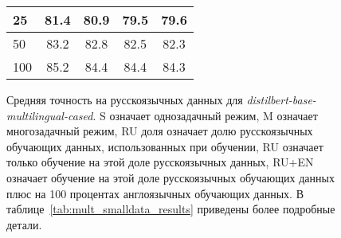 \begin{figure}[!htbp]
\begin{minipage}{0.45\textwidth}
{{\begin{tabular}[baseline={(0,2.1)}]{|l||c|c|c|c|}
25 & 81.4 & 80.9 & 79.5 & 79.6 \\ \hline
50 & 83.2 & 82.8 & 82.5 & 82.3 \\ \hline
100 & 85.2 & 84.4 & 84.4 & 84.3 \\ \hline
\end{tabular}}
}
\end{minipage}
\caption{Средняя точность на русскоязычных данных для \textit{distilbert-base-multilingual-cased}. S означает однозадачный режим, M означает многозадачный режим, RU доля означает долю русскоязычных обучающих данных, использованных при обучении, RU означает только обучение на этой доле русскоязычных данных, RU+EN означает обучение на этой доле русскоязычных обучающих данных плюс на 100 процентах англоязычных обучающих данных. В таблице~\ref{tab:mult_smalldata_results} приведены более подробные детали.}
\label{fig:tr-ag:ru_dialog_part}
\end{figure}
%

